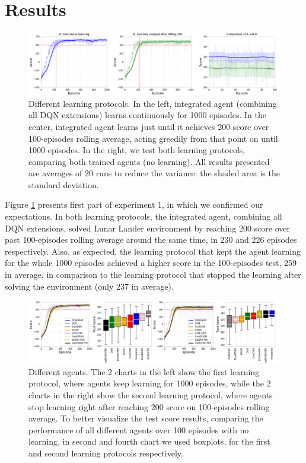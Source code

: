 \documentclass{article}
\begin{document}
    \section{Results}
    \label{sec:results}

    \begin{figure}[t]
        \includegraphics[width=\textwidth]{./images/fig1.png}
        \centering
        \caption{Different learning protocols.
        In the left, integrated agent (combining all DQN extensions) learns continuously for 1000 episodes.
        In the center, integrated agent learns just until it achieves 200 score over 100-episodes rolling average, acting greedily from that point on until 1000 episodes.
        In the right, we test both learning protocols, comparing both trained agents (no learning).
        All results presented are averages of 20 runs to reduce the variance: the shaded area is the standard deviation.}
        \label{fig:fig1}
    \end{figure}

    Figure \ref{fig:fig1} presents first part of experiment 1, in which we confirmed our expectations.
    In both learning protocols, the integrated agent, combining all DQN extensions, solved Lunar Lander environment by reaching 200 score over past 100-episodes rolling average around the same time, in 230 and 226 episodes respectively.
    Also, as expected, the learning protocol that kept the agent learning for the whole 1000 episodes achieved a higher score in the 100-episodes test, 259 in average, in comparison to the learning protocol that stopped the learning after solving the environment (only 237 in average).

    \begin{figure}[h]
        \includegraphics[width=\textwidth]{./images/fig2.png}
        \centering
        \caption{Different agents.
        The 2 charts in the left show the first learning protocol, where agents keep learning for 1000 episodes, while the 2 charts in the right show the second learning protocol, where agents stop learning right after reaching 200 score on 100-episodes rolling average.
        To better visualize the test score results, comparing the performance of all different agents over 100 episodes with no learning, in second and fourth chart we used boxplots, for the first and second learning protocols respectively.}
        \label{fig:fig2}
    \end{figure}
\end{document}
